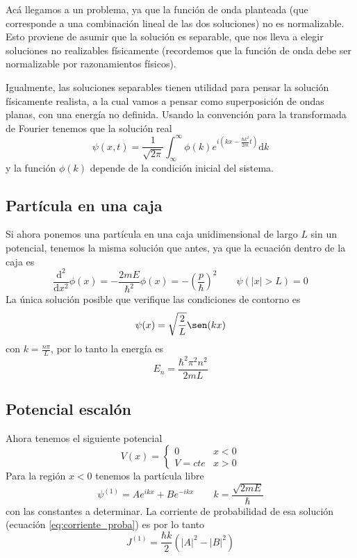 Acá llegamos a un problema, ya que la función de onda planteada (que corresponde a una combinación lineal de las dos soluciones) no es normalizable. 
Esto proviene de asumir que la solución es separable, que nos lleva a elegir soluciones no realizables físicamente (recordemos que la función de onda debe ser normalizable por razonamientos físicos).

Igualmente, las soluciones separables tienen utilidad para pensar la solución físicamente realista, a la cual vamos a pensar como superposición de ondas planas, con una energía no definida.
Usando la convención para la transformada de Fourier tenemos que la solución real
\begin{equation}
    \psi(x, t) = \frac{1}{\sqrt{2\pi}} \int_{\infty}^{\infty} \phi(k) e^{i \left(k x - \frac{\hbar k^2}{2m} t\right)} \mathrm{d}k
\end{equation}
y la función $\phi(k)$ depende de la condición inicial del sistema.

\subsection{Partícula en una caja}
Si ahora ponemos una partícula en una caja unidimensional de largo $L$ sin un potencial, tenemos la misma solución que antes, ya que la ecuación dentro de la caja es
\begin{equation}
    \frac{\mathrm{d}^2}{\mathrm{d}x^2} \phi(x) = - \frac{2 m E}{\hbar^2} \phi(x) = - \left(\frac{p}{\hbar}\right)^2 \qquad \psi(|x| > L) = 0
\end{equation}
La única solución posible que verifique las condiciones de contorno es
\begin{equation}
    \psi(x) = \sqrt{\frac{2}{L}} \sen(k x) 
\end{equation}
con $k = \frac{n \pi}{L}$, por lo tanto la energía es
\begin{equation}
    E_n = \frac{\hbar^2 \pi^2 n^2}{2 m L}
\end{equation}

\subsection{Potencial escalón}

Ahora tenemos el siguiente potencial
\begin{equation}
V(x) = \begin{cases} 0 & x < 0 \\ V = cte & x > 0 \end{cases}
\end{equation}
Para la región $x < 0$ tenemos la partícula libre
\begin{equation}
    \psi^{(1)} = A e^{i k x} + B e^{- i k x} \qquad k = \frac{\sqrt{2 m E}}{\hbar}
\end{equation}
con las constantes a determinar.
La corriente de probabilidad de esa solución (ecuación \ref{eq:corriente_proba}) es por lo tanto
\begin{equation}
    J^{(1)} = \frac{\hbar k}{2} (|A|^2 - |B|^2)
\end{equation}

